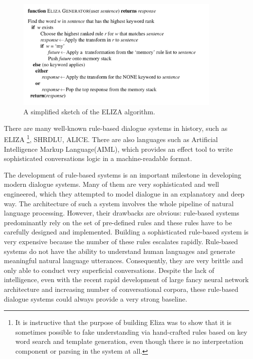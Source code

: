 \documentclass[bsc,frontabs,twoside,singlespacing,parskip,deptreport]{infthesis}     %
\begin{document}
\begin{figure}[h]
    \centering
    \includegraphics[width=0.9\textwidth]{elizarule.jpeg}
    \caption{A simplified sketch of the ELIZA algorithm.}
    \label{fig:elizarule}
\end{figure}

There are many well-known rule-based dialogue systems in history, such as ELIZA\cite{weizenbaum1966eliza} \footnote{It is instructive that the purpose of building Eliza was to show that it is sometimes possible to fake understanding via hand-crafted rules based on key word search and template generation, even though there is no interpretation component or parsing in the system at all.}, SHRDLU\cite{winograd1972shrdlu}, ALICE\cite{wallace1995artificial}. There are also languages such as Artificial Intelligence Markup Language(AIML), which provides an effect tool to write sophisticated conversations logic in a machine-readable format\cite{wallace1995artificial}.

The development of rule-based systems is an important milestone in developing modern dialogue systems. Many of them are very sophisticated and well engineered, which they attempted to model dialogue in an explanatory and deep way. The architecture of such a system involves the whole pipeline of natural language processing. However, their drawbacks are obvious: rule-based systems predominantly rely on the set of pre-defined rules and these rules have to be carefully designed and implemented. Building a sophisticated rule-based system is very expensive because the number of these rules escalates rapidly. Rule-based systems do not have the ability to understand human languages and generate meaningful natural language utterances\cite{jiweilithesis}. Consequently, they are very brittle and only able to conduct very superficial conversations. Despite the lack of intelligence, even with the recent rapid development of large fancy neural network architecture and increasing number of conversational corpora, these rule-based dialogue systems could always provide a very strong baseline.
\end{document}
